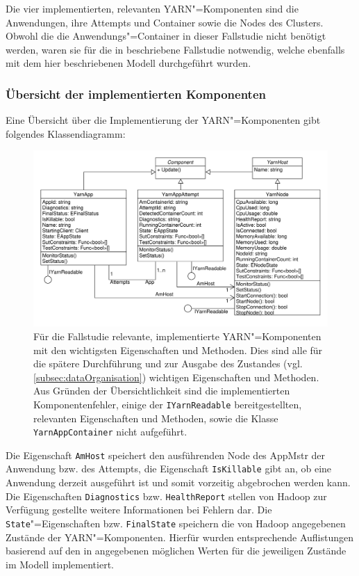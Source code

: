 Die vier implementierten, relevanten \ac{YARN}"=Komponenten sind die Anwendungen, ihre Attempts und Container sowie die Nodes des Clusters.
Obwohl die die Anwendungs"=Container in dieser Fallstudie nicht benötigt werden, waren sie für die in \cite{Eberhardinger2018} beschriebene Fallstudie notwendig, welche ebenfalls mit dem hier beschriebenen Modell durchgeführt wurden.

\subsubsection{Übersicht der implementierten Komponenten}
\label{subsec:yarnComponentsOverview}

Eine Übersicht über die Implementierung der \ac{YARN}"=Komponenten gibt folgendes Klassendiagramm:

\begin{figure}[h]
    \includegraphics[width=\columnwidth]{./images/yarnComponents.pdf}
    \caption[Für die Fallstudie relevante, implementierte \acs{YARN}"=Komponenten mit den wichtigsten Eigenschaften und Methoden]
        {Für die Fallstudie relevante, implementierte \acs{YARN}"=Komponenten mit den wichtigsten Eigenschaften und Methoden.
        Dies sind alle für die spätere Durchführung und zur Ausgabe des Zustandes (vgl. \cref{subsec:dataOrganisation}) wichtigen Eigenschaften und Methoden.
        Aus Gründen der Übersichtlichkeit sind die implementierten Komponentenfehler, einige der \texttt{IYarnReadable} bereitgestellten, relevanten Eigenschaften und Methoden, sowie die Klasse \texttt{YarnAppContainer} nicht aufgeführt.}
    \label{fig:yarnComponentsClassDiagram}
\end{figure}

Die Eigenschaft \texttt{AmHost} speichert den ausführenden Node des \ac{AppMstr} der Anwendung bzw. des Attempts, die Eigenschaft \texttt{IsKillable} gibt an, ob eine Anwendung derzeit ausgeführt ist und somit vorzeitig abgebrochen werden kann.
Die Eigenschaften \texttt{Diagnostics} bzw. \texttt{HealthReport} stellen von Hadoop zur Verfügung gestellte weitere Informationen bei Fehlern dar.
Die \texttt{State}"=Eigenschaften bzw. \texttt{FinalState} speichern die von Hadoop angegebenen Zustände der \ac{YARN}"=Komponenten.
Hierfür wurden entsprechende Auflistungen basierend auf den in \cite{HadoopRmApi271} angegebenen möglichen Werten für die jeweiligen Zustände im Modell implementiert.

